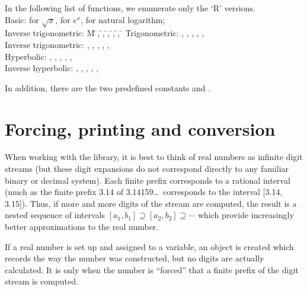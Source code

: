 \documentclass[a4paper,12pt]{article}
\begin{document}
\begin{tabbing}
In the following list of functions,
we enumerate only the `R' versions.\\[0.5ex]
Basic:\quad  {} for $\sqrt{x}$,\quad
              for $e^x$,\quad
              for natural logarithm;\\[0.5ex]
Inverse trigonometric:
M \= ,
  \= ,
  \= ,
  \= ,
  \= ,
  \=  \kill
Trigonometric:          
  \> ,    
  \> ,    
  \> ,
  \> ,
  \> ,
  \> 
  \\[0.5ex]
Inverse trigonometric:  
  \> ,   
  \> ,   
  \> ,
  \> ,
  \> ,
  \> 
  \\[0.5ex]
Hyperbolic:             
  \> ,   
  \> ,   
  \> ,
  \> ,
  \> ,
  \> 
  \\[0.5ex]
Inverse hyperbolic:     
  \> ,  
  \> ,  
  \> ,
  \> ,
  \> ,
  \> 
  \\[0.5ex]
\end{tabbing}
\vspace{-1ex}

\noindent In addition, there are the two predefined constants
  and  .

\section{Forcing, printing and conversion}

When working with the library,
it is best to think of real numbers as infinite digit streams
(but these digit expansions do not correspond directly
 to any familiar binary or decimal system).
Each finite prefix corresponds to a rational interval
(much as the finite prefix 3.14 of 3.14159\ldots\
corresponds to the interval [3.14, 3.15]).
Thus, if more and more digits of the stream are computed,
the result is a nested sequence of intervals
$[a_1, b_1] \supseteq [a_2, b_2] \supseteq \cdots$
which provide increasingly better approximations to the real number.

If a real number is set up and assigned to a variable,
an object is created which records the way the number was constructed,
but no digits are actually calculated.
It is only when the number is ``forced''
that a finite prefix of the digit stream is computed.
\end{document}
